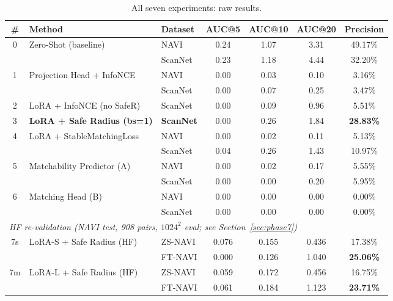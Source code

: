 \documentclass[11pt,a4paper]{article}
\begin{document}
\begin{table}[H]
\centering\small
\caption{All seven experiments: raw results.}
\label{tab:all_results}
\begin{tabular}{@{}cllcccc@{}}
\toprule
\# & \textbf{Method} & \textbf{Dataset} & \textbf{AUC@5} & \textbf{AUC@10} & \textbf{AUC@20} & \textbf{Precision} \\
\midrule
\multirow{2}{*}{0} & \multirow{2}{*}{\color{green!55!black}Zero-Shot (baseline)}
    & NAVI    & 0.24 & 1.07 & 3.31 & \color{green!55!black}49.17\% \\
  & & ScanNet & 0.23 & 1.18 & 4.44 & \color{green!55!black}32.20\% \\
\midrule
\multirow{2}{*}{1} & \multirow{2}{*}{Projection Head + InfoNCE}
    & NAVI    & 0.00 & 0.03 & 0.10 & 3.16\% \\
  & & ScanNet & 0.00 & 0.07 & 0.25 & 3.47\% \\
\midrule
2 & LoRA + InfoNCE (no SafeR) & ScanNet & 0.00 & 0.09 & 0.96 & 5.51\% \\
\midrule
3 & \textbf{LoRA + Safe Radius (bs=1)} & \textbf{ScanNet} & 0.00 & 0.26 & 1.84 & \color{orange!75!black}\textbf{28.83\%} \\
\midrule
\multirow{2}{*}{4} & \multirow{2}{*}{LoRA + StableMatchingLoss}
    & NAVI    & 0.00 & 0.02 & 0.11 &  5.13\% \\
  & & ScanNet & 0.04 & 0.26 & 1.43 & 10.97\% \\
\midrule
\multirow{2}{*}{5} & \multirow{2}{*}{Matchability Predictor (A)}
    & NAVI    & 0.00 & 0.02 & 0.17 &  5.55\% \\
  & & ScanNet & 0.00 & 0.00 & 0.20 &  5.95\% \\
\midrule
\multirow{2}{*}{6} & \multirow{2}{*}{\color{red!75!black}Matching Head (B)}
    & NAVI    & \color{red!75!black}0.00 & \color{red!75!black}0.00 & \color{red!75!black}0.00 & \color{red!75!black}0.00\% \\
  & & ScanNet & \color{red!75!black}0.00 & \color{red!75!black}0.00 & \color{red!75!black}0.00 & \color{red!75!black}0.00\% \\
\midrule
\multicolumn{7}{l}{\textit{HF re-validation (NAVI test, 908 pairs, $1024^2$ eval; see Section~\ref{sec:phase7})}} \\
\multirow{2}{*}{7s} & \multirow{2}{*}{\color{green!55!black}LoRA-S + Safe Radius (HF)}
    & ZS-NAVI & 0.076 & 0.155 & 0.436 & 17.38\% \\
  & & FT-NAVI & 0.000 & 0.126 & 1.040 & \color{green!55!black}\textbf{25.06\%} \\
\midrule
\multirow{2}{*}{7m} & \multirow{2}{*}{\color{green!55!black}LoRA-L + Safe Radius (HF)}
    & ZS-NAVI & 0.059 & 0.172 & 0.456 & 16.75\% \\
  & & FT-NAVI & 0.061 & 0.184 & 1.123 & \color{green!55!black}\textbf{23.71\%} \\
\bottomrule
\end{tabular}
\end{table}
\end{document}
